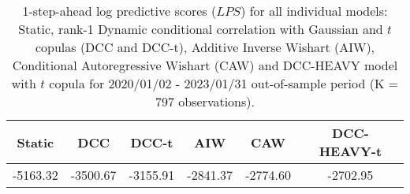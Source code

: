 \begin{table}[ht]
\centering
\caption{1-step-ahead log predictive scores ($LPS$) 
             for all individual models: Static, rank-1 Dynamic conditional correlation with Gaussian and $t$ copulas (DCC
and DCC-t), Additive Inverse Wishart (AIW), Conditional Autoregressive Wishart (CAW)
and DCC-HEAVY model with $t$ copula for 
2020/01/02 - 2023/01/31 out-of-sample period
(K = 797 observations).} 
\label{table:lps_FX}
\begin{tabular}{cccccc}
  \hline
Static & DCC & DCC-t & AIW & CAW & DCC-HEAVY-t \\ 
  \hline
-5163.32 & -3500.67 & -3155.91 & -2841.37 & -2774.60 & -2702.95 \\ 
   \hline
\end{tabular}
\end{table}
